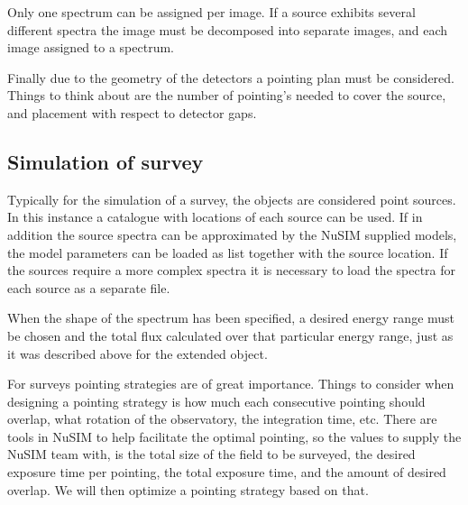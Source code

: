 Only one spectrum can be assigned per image. If a source exhibits several different spectra the image must be decomposed into separate images, and each image assigned to a spectrum.

Finally due to the geometry of the detectors a pointing plan must be considered. Things to think about are the number of pointing's needed to cover the source, and placement with respect to detector gaps.

\subsection{Simulation of survey}
Typically for the simulation of a survey, the objects are considered point sources. In this instance a catalogue with locations of each source can be used. If in addition the source spectra can be approximated by the NuSIM supplied models, the model parameters can be loaded as list together with the source location. If the sources require a more complex spectra it is necessary to load the spectra for each source as a separate file.

When the shape of the spectrum has been specified, a desired energy range must be chosen and the total flux calculated over that particular energy range, just as it was described above for the extended object.

For surveys pointing strategies are of great importance. Things to consider when designing a pointing strategy is how much each consecutive pointing should overlap, what rotation of the observatory, the integration time, etc. There are tools in NuSIM to help facilitate the optimal pointing, so the values to supply the NuSIM team with, is the total size of the field to be surveyed, the desired exposure time per pointing, the total exposure time, and the amount of desired overlap. We will then optimize a pointing strategy based on that.

%
